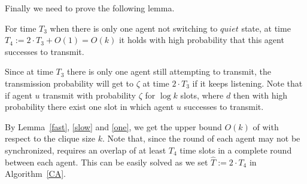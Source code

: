 Finally we need to prove the following lemma.
\begin{lemma}
    \label{one}
    For time $T_3$ when there is only one agent not switching to $quiet$ state,
    at time $T_4 := 2 \cdot T_3 + O(1) = O(k)$ it holds with high 
    probability that this agent successes to transmit.
\end{lemma}
\begin{IEEEproof}
    Since at time $T_3$ there is only one agent still attempting to transmit,
    the transmission probability will get to $\zeta$ at time $2\cdot T_3$ if it keeps
    listening. Note that if agent $u$ transmit with probability $\zeta$ for $\log k$ slots,
    where $d$
    then with high probability there exist one slot in which agent $u$ successes to transmit.
\end{IEEEproof}

By Lemma~\ref{fast}, \ref{slow} and \ref{one},
we get the upper bound $O(k)$ of {\pName} with respect to
the clique size $k$. Note that, since the round of each agent may not be 
synchronized, {\pName} requires an overlap of at least $T_4$ time 
slots in a complete round between each agent.
This can be easily solved as we set $\hat{T} := 2\cdot T_4$ in Algorithm~\ref{CA}. 




